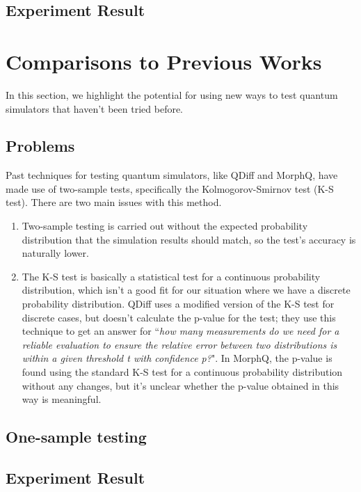 \documentclass[10pt,a4paper]{article}
\newcommand{\<}{\langle}
\renewcommand{\>}{\rangle}
\begin{document}
\subsection{Experiment Result}


\section{Comparisons to Previous Works}

In this section, we highlight the potential for using new ways to test quantum simulators that
haven't been tried before.

\subsection{Problems}
Past techniques for testing quantum simulators, like QDiff and MorphQ, have made use of two-sample
tests, specifically the Kolmogorov-Smirnov test (K-S test). There are two main issues with this
method.

\begin{enumerate}
  \item
    Two-sample testing is carried out without the expected probability distribution that the
    simulation results should match, so the test's accuracy is naturally lower.
  \item
    The K-S test is basically a statistical test for a continuous probability distribution, which
    isn't a good fit for our situation where we have a discrete probability distribution. QDiff uses
    a modified version of the K-S test for discrete cases,
    but doesn't calculate the p-value for the test; they use this technique to get an answer for
    ``\textit{how many measurements do we need for a reliable evaluation to ensure the relative error
    between two distributions is within a given threshold t with confidence p?}".
    In MorphQ, the p-value is found using the standard K-S test for a
    continuous probability distribution without any changes, but it's unclear whether the p-value
    obtained in this way is meaningful.
\end{enumerate}

\subsection{One-sample testing}
\subsection{Experiment Result}
\end{document}
